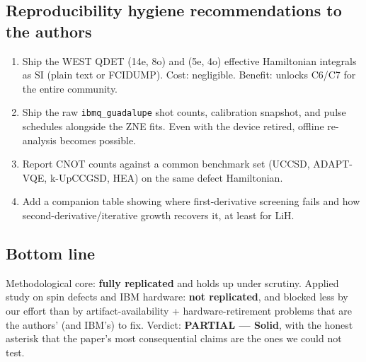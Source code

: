 \documentclass[11pt]{article}
\begin{document}
\subsection*{Reproducibility hygiene recommendations to the authors}
\begin{enumerate}\itemsep0.1em
\item Ship the WEST QDET (14e, 8o) and (5e, 4o) effective Hamiltonian integrals as SI (plain text or FCIDUMP). Cost: negligible. Benefit: unlocks C6/C7 for the entire community.
\item Ship the raw \texttt{ibmq\_guadalupe} shot counts, calibration snapshot, and pulse schedules alongside the ZNE fits. Even with the device retired, offline re-analysis becomes possible.
\item Report CNOT counts against a common benchmark set (UCCSD, ADAPT-VQE, k-UpCCGSD, HEA) on the same defect Hamiltonian.
\item Add a companion table showing where first-derivative screening fails and how second-derivative/iterative growth recovers it, at least for LiH.
\end{enumerate}

\subsection*{Bottom line}
Methodological core: \textbf{fully replicated} and holds up under scrutiny. Applied study on spin defects and IBM hardware: \textbf{not replicated}, and blocked less by our effort than by artifact-availability + hardware-retirement problems that are the authors' (and IBM's) to fix. Verdict: \textbf{PARTIAL --- Solid}, with the honest asterisk that the paper's most consequential claims are the ones we could not test.
\end{document}

